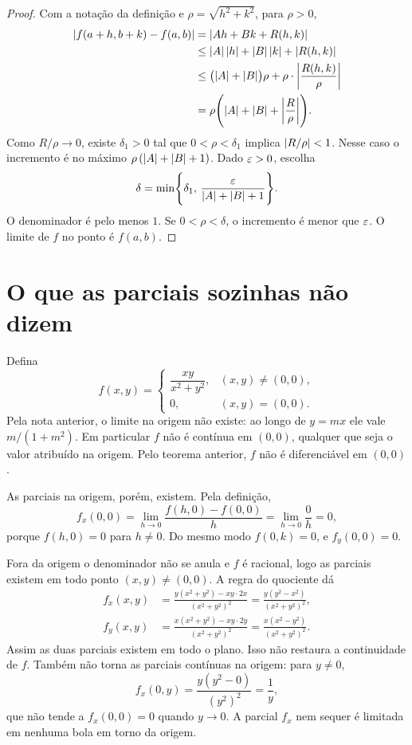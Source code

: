 \documentclass[11pt,a4paper]{article}
\begin{document}
\begin{proof}
Com a notação da definição e $\rho=\sqrt{h^2+k^2}$, para $\rho>0$,
\begin{align*}
\left\lvert f(a+h,b+k)-f(a,b) \right\rvert
&=\left\lvert Ah+Bk+R(h,k) \right\rvert\\
&\le\left\lvert A \right\rvert\left\lvert h \right\rvert+\left\lvert B \right\rvert\left\lvert k \right\rvert+\left\lvert R(h,k) \right\rvert\\
&\le\bigl(\left\lvert A \right\rvert+\left\lvert B \right\rvert\bigr)\rho+\rho\cdot\left\lvert \frac{R(h,k)}{\rho} \right\rvert\\
&=\rho\Biggl(\left\lvert A \right\rvert+\left\lvert B \right\rvert+\left\lvert \frac{R}{\rho} \right\rvert\Biggr).
\end{align*}
Como $R/\rho\to 0$, existe $\delta_1>0$ tal que $0<\rho<\delta_1$ implica $\left\lvert R/\rho \right\rvert<1$. Nesse caso o incremento é no máximo $\rho\,(\left\lvert A \right\rvert+\left\lvert B \right\rvert+1)$. Dado $\varepsilon>0$, escolha
\[
\delta=\min\Biggl\{\delta_1,\,\frac{\varepsilon}{\left\lvert A \right\rvert+\left\lvert B \right\rvert+1}\Biggr\}.
\]
O denominador é pelo menos $1$. Se $0<\rho<\delta$, o incremento é menor que $\varepsilon$. O limite de $f$ no ponto é $f(a,b)$.
\end{proof}

\section{O que as parciais sozinhas não dizem}


\begin{contraexemplo}
Defina
\[
f(x,y)=\begin{cases}
\dfrac{xy}{x^2+y^2}, & (x,y)\neq(0,0),\\[1mm]
0, & (x,y)=(0,0).
\end{cases}
\]
Pela nota anterior, o limite na origem não existe: ao longo de $y=mx$ ele vale $m/(1+m^2)$. Em particular $f$ não é contínua em $(0,0)$, qualquer que seja o valor atribuído na origem. Pelo teorema anterior, $f$ não é diferenciável em $(0,0)$.

As parciais na origem, porém, existem. Pela definição,
\[
f_x(0,0)=\lim_{h\to 0}\frac{f(h,0)-f(0,0)}{h}=\lim_{h\to 0}\frac{0}{h}=0,
\]
porque $f(h,0)=0$ para $h\neq 0$. Do mesmo modo $f(0,k)=0$, e $f_y(0,0)=0$.

Fora da origem o denominador não se anula e $f$ é racional, logo as parciais existem em todo ponto $(x,y)\neq(0,0)$. A regra do quociente dá
\begin{align*}
f_x(x,y)&=\frac{y(x^2+y^2)-xy\cdot 2x}{(x^2+y^2)^2}=\frac{y(y^2-x^2)}{(x^2+y^2)^2},\\[1mm]
f_y(x,y)&=\frac{x(x^2+y^2)-xy\cdot 2y}{(x^2+y^2)^2}=\frac{x(x^2-y^2)}{(x^2+y^2)^2}.
\end{align*}
Assim as duas parciais existem em todo o plano. Isso não restaura a continuidade de $f$. Também não torna as parciais contínuas na origem: para $y\neq 0$,
\[
f_x(0,y)=\frac{y(y^2-0)}{(y^2)^2}=\frac{1}{y},
\]
que não tende a $f_x(0,0)=0$ quando $y\to 0$. A parcial $f_x$ nem sequer é limitada em nenhuma bola em torno da origem.
\end{contraexemplo}
\end{document}
